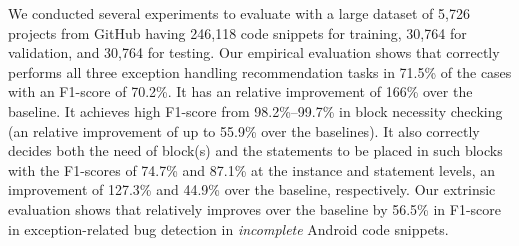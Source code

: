 %

We conducted several experiments to evaluate {\tool} with
a large dataset of 5,726 projects from GitHub
having 246,118 code snippets for training, 30,764 for validation,
and 30,764 for testing.
Our empirical evaluation shows that {\tool} correctly performs all
three exception handling recommendation tasks in 71.5\% of the cases
with an F1-score of 70.2\%. It has an relative improvement of 166\%
over the baseline. It achieves high F1-score from 98.2\%--99.7\% in
 block necessity checking (an relative improvement of
up to 55.9\% over the baselines). It also correctly decides both the
need of  block(s) and the statements to be placed in
such blocks with the F1-scores of 74.7\% and 87.1\% at the instance
and statement levels, an improvement of 127.3\% and 44.9\% over the
baseline, respectively. Our extrinsic evaluation shows that {\tool}
relatively improves over the baseline by 56.5\% in F1-score in
exception-related bug detection in {\em incomplete} Android code
snippets.

